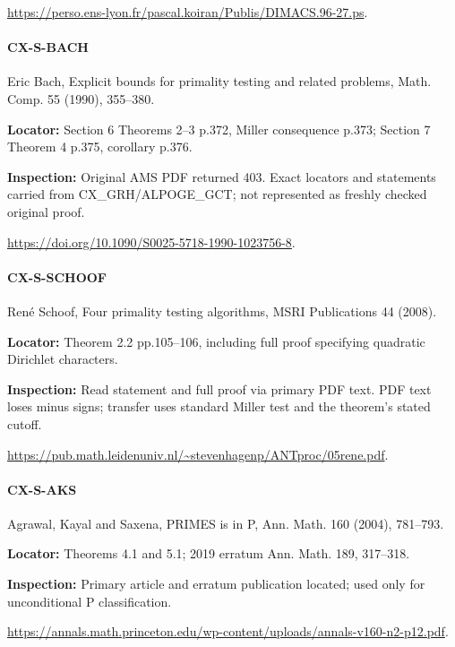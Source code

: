 \documentclass[11pt,a4paper]{article}
\begin{document}
\url{https://perso.ens-lyon.fr/pascal.koiran/Publis/DIMACS.96-27.ps}.

\paragraph{CX-S-BACH} Eric Bach, Explicit bounds for primality testing and related problems, Math.\allowbreak{} Comp.\allowbreak{} 55 (1990), 355–\allowbreak{}380.

\textbf{Locator:} Section 6 Theorems 2–\allowbreak{}3 p.\allowbreak{}372, Miller consequence p.\allowbreak{}373; Section 7 Theorem 4 p.\allowbreak{}375, corollary p.\allowbreak{}376.

\textbf{Inspection:} Original AMS PDF returned 403.\allowbreak{} Exact locators and statements carried from CX\_\allowbreak{}GRH/\allowbreak{}ALPOGE\_\allowbreak{}GCT; not represented as freshly checked original proof.\allowbreak{}

\url{https://doi.org/10.1090/S0025-5718-1990-1023756-8}.

\paragraph{CX-S-SCHOOF} René Schoof, Four primality testing algorithms, MSRI Publications 44 (2008).

\textbf{Locator:} Theorem 2.\allowbreak{}2 pp.\allowbreak{}105–\allowbreak{}106, including full proof specifying quadratic Dirichlet characters.

\textbf{Inspection:} Read statement and full proof via primary PDF text.\allowbreak{} PDF text loses minus signs; transfer uses standard Miller test and the theorem’s stated cutoff.\allowbreak{}

\url{https://pub.math.leidenuniv.nl/~stevenhagenp/ANTproc/05rene.pdf}.

\paragraph{CX-S-AKS} Agrawal, Kayal and Saxena, PRIMES is in P, Ann.\allowbreak{} Math.\allowbreak{} 160 (2004), 781–\allowbreak{}793.

\textbf{Locator:} Theorems 4.\allowbreak{}1 and 5.\allowbreak{}1; 2019 erratum Ann.\allowbreak{} Math.\allowbreak{} 189, 317–\allowbreak{}318.

\textbf{Inspection:} Primary article and erratum publication located; used only for unconditional P classification.\allowbreak{}

\url{https://annals.math.princeton.edu/wp-content/uploads/annals-v160-n2-p12.pdf}.
\end{document}
